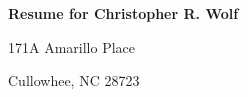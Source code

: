 \documentclass[12pt]{letter}
\begin{document}
    \centerline{\textbf{Resume for Christopher R. Wolf}}
    \centerline{171A Amarillo Place}
    \centerline{Cullowhee, NC 28723}
\end{document}
